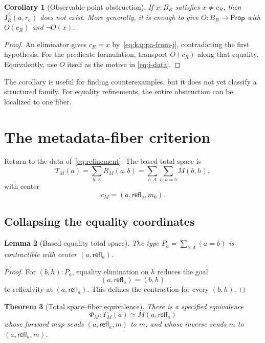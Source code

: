 \documentclass[10pt,reqno]{amsart}
\newtheorem{theorem}{Theorem}[section]
\newtheorem{lemma}[theorem]{Lemma}
\newtheorem{corollary}[theorem]{Corollary}
\newcommand{\Eqv}{\simeq}
\newcommand{\Jbeta}{\mathsf J^\beta}
\newcommand{\refl}{\mathsf{refl}}
\begin{document}
\begin{corollary}[Observable-point obstruction]
\label{cor:observable-point}
If \(x:B_R\) satisfies \(x\ne c_R\), then \(\Jbeta_R(a,r_a)\) does not exist.
More generally, it is enough to give \(O:B_R\to\mathsf{Prop}\) with
\(O(c_R)\) and \(\neg O(x)\).
\end{corollary}

\begin{proof}
An eliminator gives \(c_R=x\) by~\eqref{eq:kappa-from-j}, contradicting the
first hypothesis.  For the predicate formulation, transport \(O(c_R)\) along
that equality.  Equivalently, use \(O\) itself as the motive in
\eqref{eq:j-data}.
\end{proof}

The corollary is useful for finding counterexamples, but it does not yet
classify a structured family.  For equality refinements, the entire
obstruction can be localized to one fiber.

\section{The metadata-fiber criterion}
\label{sec:metadata}

Return to the data of~\eqref{eq:refinement}.  The based total space is
\[
       T_M(a)
       =\sum_{b:A}R_M(a,b)
       =\sum_{b:A}\sum_{h:a=b}M(b,h),
\tag{4.1}\label{eq:metadata-total}
\]
with center
\[
                         c_M=(a,\refl_a,m_0).
\tag{4.2}\label{eq:metadata-center}
\]

\subsection{Collapsing the equality coordinates}

\begin{lemma}[Based equality total space]
\label{lem:equality-total}
The type \(P_a=\sum_{b:A}(a=b)\) is contractible with center
\((a,\refl_a)\).
\end{lemma}

\begin{proof}
For \((b,h):P_a\), equality elimination on \(h\) reduces the goal
\[
                    (a,\refl_a)=(b,h)
\]
to reflexivity at \((a,\refl_a)\).  This defines the contraction for every
\((b,h)\).
\end{proof}

\begin{theorem}[Total space--fiber equivalence]
\label{thm:total-fiber}
There is a specified equivalence
\[
             \Phi_M:T_M(a)\Eqv M(a,\refl_a)
\tag{4.3}\label{eq:total-fiber}
\]
whose forward map sends \((a,\refl_a,m)\) to \(m\), and whose inverse sends
\(m\) to \((a,\refl_a,m)\).
\end{theorem}
\end{document}
